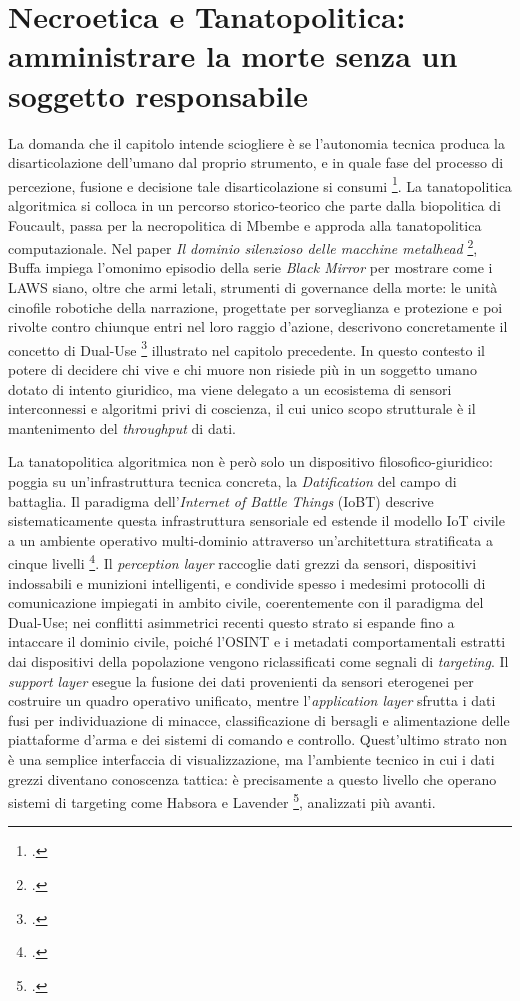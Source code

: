 \documentclass[a4paper,12pt]{report}
\begin{document}
\section{Necroetica e Tanatopolitica: amministrare la morte senza un soggetto responsabile}

La domanda che il capitolo intende sciogliere è se l'autonomia tecnica produca la
disarticolazione dell'umano dal proprio strumento, e in quale fase del processo
di percezione, fusione e decisione tale disarticolazione si consumi
\footcite{buffa_2025}. La tanatopolitica algoritmica si colloca in un percorso
storico-teorico che parte dalla biopolitica di Foucault, passa per la
necropolitica di Mbembe e approda alla tanatopolitica computazionale. Nel paper
\textit{Il dominio silenzioso delle macchine metalhead} \footcite{buffa_2025},
Buffa impiega l'omonimo episodio della serie \textit{Black Mirror} per mostrare
come i LAWS siano, oltre che armi letali, strumenti di governance della morte: le
unità cinofile robotiche della narrazione, progettate per sorveglianza e
protezione e poi rivolte contro chiunque entri nel loro raggio d'azione,
descrivono concretamente il concetto di Dual-Use \footcite{longpre_2022}
illustrato nel capitolo precedente. In questo contesto il potere di decidere chi
vive e chi muore non risiede più in un soggetto umano dotato di intento
giuridico, ma viene delegato a un ecosistema di sensori interconnessi e algoritmi
privi di coscienza, il cui unico scopo strutturale è il mantenimento del
\textit{throughput} di dati.

La tanatopolitica algoritmica non è però solo un dispositivo filosofico-giuridico:
poggia su un'infrastruttura tecnica concreta, la \textit{Datification} del campo
di battaglia. Il paradigma dell'\textit{Internet of Battle Things} (IoBT)
descrive sistematicamente questa infrastruttura sensoriale ed estende il modello
IoT civile a un ambiente operativo multi-dominio attraverso un'architettura
stratificata a cinque livelli \footcite{kufakunesu_2025_iobt}. Il
\textit{perception layer} raccoglie dati grezzi da sensori, dispositivi
indossabili e munizioni intelligenti, e condivide spesso i medesimi protocolli
di comunicazione impiegati in ambito civile, coerentemente con il paradigma del
Dual-Use; nei conflitti asimmetrici recenti questo strato si espande fino a
intaccare il dominio civile, poiché l'OSINT e i metadati comportamentali estratti
dai dispositivi della popolazione vengono riclassificati come segnali di
\textit{targeting}. Il \textit{support layer} esegue la fusione dei dati
provenienti da sensori eterogenei per costruire un quadro operativo unificato,
mentre l'\textit{application layer} sfrutta i dati fusi per individuazione di
minacce, classificazione di bersagli e alimentazione delle piattaforme d'arma e
dei sistemi di comando e controllo. Quest'ultimo strato non è una semplice
interfaccia di visualizzazione, ma l'ambiente tecnico in cui i dati grezzi
diventano conoscenza tattica: è precisamente a questo livello che operano sistemi
di targeting come Habsora e Lavender \footcite{oliveri_2024}, analizzati più
avanti.
\end{document}
